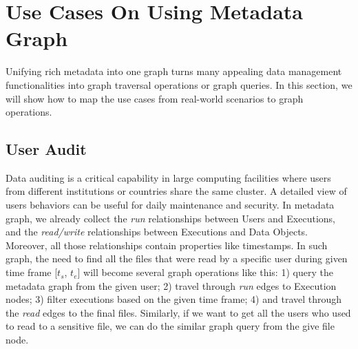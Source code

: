 \section{Use Cases On Using Metadata Graph}

Unifying rich metadata into one graph turns many appealing data management functionalities into graph traversal operations or graph queries. In this section, we will show how to map the use cases from real-world scenarios to graph operations.

\subsection{User Audit}

Data auditing is a critical capability in large computing facilities where users from different institutions or countries share the same cluster. A detailed view of users behaviors can be useful for daily maintenance and security. In metadata graph, we already collect the \textit{run} relationships between Users and Executions, and the \textit{read/write} relationships between Executions and Data Objects. Moreover, all those relationships contain properties like timestamps. In such graph, the need to find all the files that were read by a specific user during given time frame [$t_s$, $t_e$] will become several graph operations like this: 1) query the metadata graph from the given user; 2) travel through \textit{run} edges to Execution nodes; 3) filter executions based on the given time frame; 4) and travel through the \textit{read} edges to the final files. Similarly, if we want to get all the users who used to read to a sensitive file, we can do the similar graph query from the give file node.




